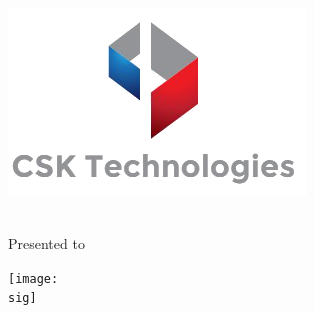 \documentclass[pdftex,20pt,a4paper] {extarticle}
\begin{document}
\clearpage
\noindent\begin{minipage}{\linewidth}
	\begin{center}	
		\includegraphics[scale=.65]{./img/logo}
	\begin{spacing}{2.5}
		{\Huge \titleAward{}}
		\\
		Presented to 
		\\
		{\huge \recName{}}
	\end{spacing}
		\proc{}
	\end{center}
		\begin{minipage}[c]{0.50\textwidth}
			    \center\dateAward{}
		\end{minipage}
	\begin{minipage}[c]{0.5\textwidth}
		\begin{center}
		\begin{spacing}{0.5}
		\texttt{[image: \\sig]}
		\\
		\giveName{}
		\end{spacing}
		\end{center}
	\end{minipage}	
\end{minipage}
\end{document}
